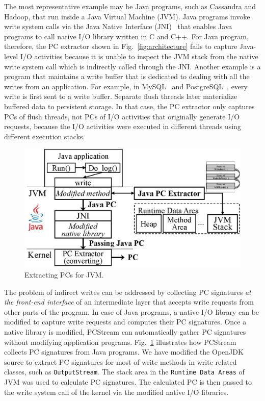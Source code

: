 The most representative example may be Java programs, such as Cassandra and
Hadoop, that run inside a Java Virtual Machine (JVM). Java programs invoke
write system calls via the Java Native Interface (JNI)~\cite{JNI} that enables
Java programs to call native I/O library written in C and C++.
For Java program, therefore, the PC extractor shown in Fig.~\ref{fig:architecture} fails
to capture Java-level I/O activities because it is unable to inspect the JVM  
stack from the native write system call which is indirectly called through the JNI.
Another example is a program that maintains a write buffer that is
dedicated to dealing with all the writes from an application. For example, in
MySQL~\cite{MySQL} and PostgreSQL~\cite{PostgreSQL}, every write is first
sent to a write buffer. Separate flush threads later materialize buffered data
to persistent storage.  In that case, the PC extractor only captures PCs of
{\color{blue}
flush threads, not PCs of I/O activities that originally generate I/O requests,
because the I/O activities were executed in different threads using different
execution stacks.
}

\begin{figure}[t]
\centering
	\includegraphics[width=0.8\linewidth]{figure/jvmpc}
	\vspace{-10pt}
	\caption{Extracting PCs for JVM.}
\label{fig:java}
	\vspace{-10pt}
\end{figure}


The problem of indirect writes can be addressed by collecting PC signatures 
{\it at the front-end interface} of an intermediate layer that accepts write requests
from other parts of the program. In case of Java programs, a native I/O library can
be modified to capture write requests and computes their PC signatures. Once a native
library is modified, \textsf{\small PCStream} can automatically gather PC signatures without modifying
application programs. Fig.~\ref{fig:java} illustrates how \textsf{PCStream}
collects PC signatures from Java programs.  We have modified the OpenJDK~\cite{OpenJDK} 
source to extract PC signatures for most of write methods in
write related classes, such as \texttt{OutputStream}.  The stack area in the
\texttt{Runtime Data Areas} of JVM was used to calculate PC signatures.  The
calculated PC is then passed to the write system call of the kernel via the
modified native I/O libraries.

